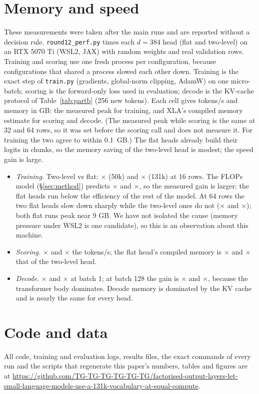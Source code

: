\documentclass[11pt]{article}
\theoremstyle{remark}
\begin{document}
\ifperfknown
\section{Memory and speed}\label{app:perf}
These measurements were taken after the main runs and are reported without a decision rule. \texttt{round12\_perf.py} times
each $d=384$ head (flat and two-level) on an RTX 5070 Ti (WSL2, JAX) with random weights and real validation rows. Training and
scoring use one fresh process per configuration, because configurations that shared a process slowed each other down. Training is
the exact step of \texttt{train.py} (gradients, global-norm clipping, AdamW) on one micro-batch; scoring is the forward-only loss
used in evaluation; decode is the KV-cache protocol of Table~\ref{tab:partb} (256 new tokens). Each cell gives tokens/s and memory
in GB: the measured peak for training, and XLA's compiled memory estimate for scoring and decode. (The measured peak while scoring
is the same at 32 and 64 rows, so it was set before the scoring call and does not measure it. For training the two agree to
within 0.1~GB.) The flat heads already build their logits in chunks, so the memory saving of the two-level head is modest; the
speed gain is large.
\begin{center}\scriptsize

\end{center}
\begin{itemize}
\item \emph{Training.} Two-level vs flat: \PerfRatioFifty{}$\times$ (50k) and \PerfRatioBig{}$\times$ (131k) at 16 rows. The
  FLOPs model (\S\ref{sec:method}) predicts \PerfPredFifty{}$\times$ and \PerfPredBig{}$\times$, so the measured gain is larger:
  the flat heads run below the efficiency of the rest of the model. At 64 rows the two flat heads slow down sharply while the
  two-level ones do not (\PerfTrRatioSixtyFourFifty{}$\times$ and \PerfTrRatioSixtyFourBig{}$\times$); both flat runs peak near
  9 GB. We have not isolated the cause (memory pressure under WSL2 is one candidate), so this is an observation about this
  machine.
\item \emph{Scoring.} \PerfScRatioFifty{}$\times$ and \PerfScRatioBig{}$\times$ the tokens/s; the flat head's compiled memory is
  \PerfScMemRatioFifty{}$\times$ and \PerfScMemRatioBig{}$\times$ that of the two-level head.
\item \emph{Decode.} \PerfDeRatioFifty{}$\times$ and \PerfDeRatioBig{}$\times$ at batch 1; at batch 128 the gain is
  \PerfDeRatioBFifty{}$\times$ and \PerfDeRatioBBig{}$\times$, because the transformer body dominates. Decode memory is dominated
  by the KV cache and is nearly the same for every head.
\end{itemize}
\fi

\section{Code and data}
All code, training and evaluation logs, results files, the exact commands of every run and the scripts that regenerate this
paper's numbers, tables and figures are at \url{https://github.com/TG-TG-TG-TG-TG-TG/factorised-output-layers-let-small-language-models-use-a-131k-vocabulary-at-equal-compute}.
\end{document}
